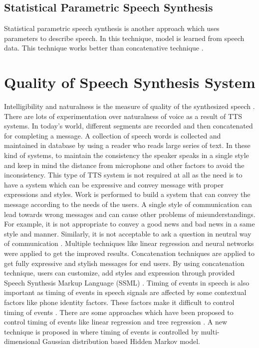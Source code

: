 \subsection{Statistical Parametric Speech Synthesis}
Statistical parametric speech synthesis is another approach which uses parameters to describe
speech. In this technique, model is learned from speech data. This technique works better than
concatenative technique \cite{merritt2013investigating}. 

\section{Quality of Speech Synthesis System}
Intelligibility and naturalness is the measure of quality of the synthesized speech \cite{swetha2013text}. 
There are lots of experimentation over naturalness of voice as a result of TTS
systems. In today’s world, different segments are recorded and then concatenated for completing a
message. A collection of speech words is collected and maintained in database by using a reader
who reads large series of text. In these kind of systems, to maintain the consistency the speaker
speaks in a single style and keep in mind the distance from microphone and other factors to avoid
the inconsistency. This type of TTS system is not required at all as the need is to have a system
which can be expressive and convey message with proper expressions and styles. Work is
performed to build a system that can convey the message according to the needs of the users. A
single style of communication can lead towards wrong messages and can cause other problems of
misunderstandings. For example, it is not appropriate to convey a good news and bad news in a same
style and manner. Similarly, it is not acceptable to ask a question in neutral way of communication \cite{eide2004corpus}.
Multiple techniques like linear regression and neural networks were applied to get the improved results. Concatenation techniques are applied to get fully
expressive and stylish messages for end users. By using concatenation technique, users can
customize, add styles and expression through provided Speech Synthesis Markup Language (SSML) \cite{eide2004corpus}. 
Timing of events in speech is also important as timing of events in
speech signals are affected by some contextual factors like phone identity factors. These factors
make it difficult to control timing of events \cite{tokuda2000speech}. There are some approaches which have been proposed
to control timing of events like linear regression \cite{kaiki1992linguistic} and tree regression \cite{riley1992tree}. 
A new technique is proposed in \cite{tokuda2000speech} where timing of events is
controlled by multi-dimensional Gaussian distribution based Hidden Markov model.

